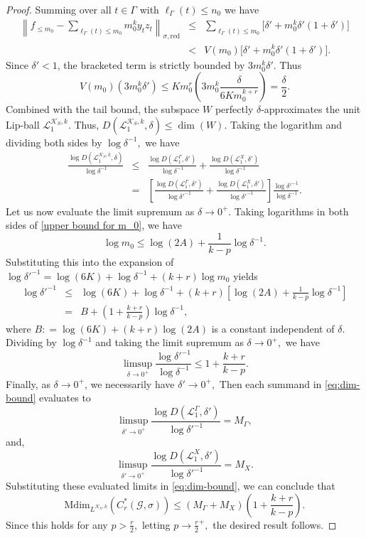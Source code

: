 \documentclass[a4paper,11pt,reqno]{amsart}
\theoremstyle{plain}
\theoremstyle{mainthmstyle}
\theoremstyle{named}
\numberwithin{equation}{section}
\newcommand{\bea}{\begin{eqnarray}}
\newcommand{\eea}{\end{eqnarray}}
\newcommand{\Bea}{\begin{eqnarray*}}
\newcommand{\Eea}{\end{eqnarray*}}
\begin{document}
\begin{proof}
Summing over all $t \in \Gamma$ with $\ell_{\Gamma} (t) \leq n_0$ we have
\Bea
    \left\| f_{\le m_0} - \sum_{\ell_{\Gamma} (t) \leq m_0} m_0^k y_t z_t \right\|_{\sigma, \mathrm{red}} & \leq & \sum_{\ell_{\Gamma} (t) \le m_0} \Big[ \delta' + m_0^k \delta'(1 + \delta') \Big] \\
    & < & V(m_0) \Big[ \delta' + m_0^k \delta'(1 + \delta') \Big].
\Eea
Since $\delta' < 1$, the bracketed term is strictly bounded by $3 m_0^k \delta'.$ Thus 
$$V(m_0) \left( 3 m_0^k \delta' \right) \le K m_0^{r} \left( 3 m_0^k \frac{\delta}{6 K m_0^{k + r}} \right) = \frac{\delta}{2}.$$
Combined with the tail bound, the subspace $W$ perfectly $\delta$-approximates the unit Lip-ball $\mathcal L_1^{\mathcal{K}_S, k}$. Thus, $D(\mathcal {L}_1^{\mathcal{K}_S, k}, \delta) \le \dim(W)$. Taking the logarithm and dividing both sides by $\log \delta^{-1},$ we have
\bea \label{eq:dim-bound}
\frac{\log D(\mathcal{L}_1^{\mathcal{K}_S, k}, \delta)}{\log \delta^{-1}} & \leq & \frac{\log D(\mathcal{L}_1^{\Gamma}, \delta')}{\log \delta^{-1}} + \frac{\log D(\mathcal{L}_1^X, \delta')}{\log \delta^{-1}} \nonumber \\
& = & \left[ \frac{\log D(\mathcal{L}_1^{\Gamma}, \delta')}{\log \delta'^{-1}} + \frac{\log D(\mathcal{L}_1^X, \delta')}{\log \delta'^{-1}} \right] \frac{\log \delta'^{-1}}{\log \delta^{-1}}.
\eea
Let us now evaluate the limit supremum as $\delta \to 0^+$. Taking logarithms in both sides of \eqref{upper bound for m_0}, we have
$$\log m_0 \leq \log(2A) + \frac{1}{k-p} \log \delta^{-1}.$$
Substituting this into the expansion of $\log \delta'^{-1} = \log(6K) + \log \delta^{-1} + (k + r) \log m_0$ yields
\Bea
\log \delta'^{-1} & \leq & \log(6 K) + \log \delta^{-1} + (k + r) \left[ \log(2A) + \frac{1}{k-p} \log \delta^{-1} \right] \\
& = & B + \left( 1 + \frac{k + r}{k - p} \right) \log \delta^{-1},
\Eea
where $B : = \log(6K) + (k + r)\log(2A)$ is a constant independent of $\delta$. Dividing by $\log \delta^{-1}$ and taking the limit supremum as $\delta \to 0^+,$ we have
$$\limsup_{\delta \to 0^+} \frac{\log \delta'^{-1}}{\log \delta^{-1}} \le 1 + \frac{k + r}{k - p}.$$
Finally, as $\delta \to 0^+$, we necessarily have $\delta' \to 0^+,$ Then each summand in \eqref{eq:dim-bound} evaluates to
$$\limsup\limits_{\delta' \to 0^+} \frac{\log D(\mathcal{L}_1^{\Gamma}, \delta')}{\log \delta'^{-1}} = M_{\Gamma},$$
and,
$$\limsup\limits_{\delta' \to 0^+} \frac{\log D(\mathcal{L}_1^X, \delta')}{\log \delta'^{-1}} = M_X.$$
Substituting these evaluated limits in \eqref{eq:dim-bound}, we can conclude that
$$\mathrm{Mdim}_{L^{\mathcal{K}_S, k}}(C_r^*(\mathcal{G}, \sigma)) \le \left( M_{\Gamma} + M_X \right) \left( 1 + \frac{k + r}{k - p} \right ).$$
Since this holds for any $p > \frac {r} {2},$ letting $p \to \frac {r} {2}^{+},$ the desired result follows.
\end{proof}
\end{document}

